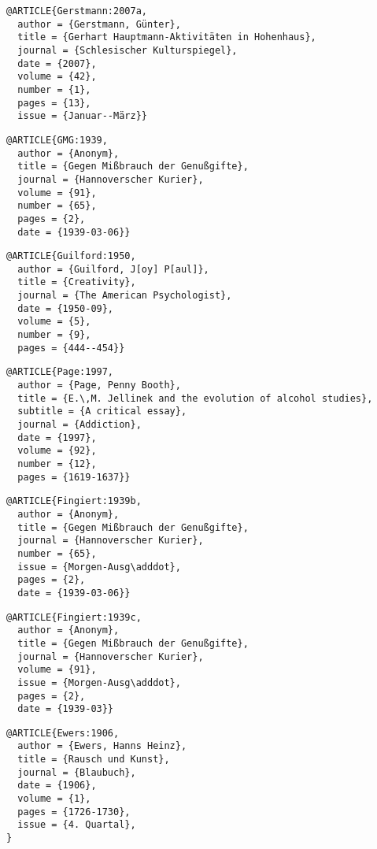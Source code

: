 \documentclass[english]{scrartcl}
\begin{document}
\begin{lstlisting}
@ARTICLE{Gerstmann:2007a,
  author = {Gerstmann, Günter},
  title = {Gerhart Hauptmann-Aktivitäten in Hohenhaus},
  journal = {Schlesischer Kulturspiegel},
  date = {2007},
  volume = {42},
  number = {1},
  pages = {13},
  issue = {Januar--März}}
\end{lstlisting}

\begin{lstlisting}
@ARTICLE{GMG:1939,
  author = {Anonym},
  title = {Gegen Mißbrauch der Genußgifte},
  journal = {Hannoverscher Kurier},
  volume = {91},
  number = {65},
  pages = {2},
  date = {1939-03-06}}
\end{lstlisting}

\begin{lstlisting}
@ARTICLE{Guilford:1950,
  author = {Guilford, J[oy] P[aul]},
  title = {Creativity},
  journal = {The American Psychologist},
  date = {1950-09},
  volume = {5},
  number = {9},
  pages = {444--454}}
\end{lstlisting}

\begin{lstlisting}
@ARTICLE{Page:1997,
  author = {Page, Penny Booth},
  title = {E.\,M. Jellinek and the evolution of alcohol studies},
  subtitle = {A critical essay},
  journal = {Addiction},
  date = {1997},
  volume = {92},
  number = {12},
  pages = {1619-1637}}
\end{lstlisting}

\begin{lstlisting}
@ARTICLE{Fingiert:1939b,
  author = {Anonym},
  title = {Gegen Mißbrauch der Genußgifte},
  journal = {Hannoverscher Kurier},
  number = {65},
  issue = {Morgen-Ausg\adddot},
  pages = {2},
  date = {1939-03-06}}
\end{lstlisting}

\begin{lstlisting}
@ARTICLE{Fingiert:1939c,
  author = {Anonym},
  title = {Gegen Mißbrauch der Genußgifte},
  journal = {Hannoverscher Kurier},
  volume = {91},
  issue = {Morgen-Ausg\adddot},
  pages = {2},
  date = {1939-03}}
\end{lstlisting}


\begin{lstlisting}
@ARTICLE{Ewers:1906,
  author = {Ewers, Hanns Heinz},
  title = {Rausch und Kunst},
  journal = {Blaubuch},
  date = {1906},
  volume = {1},
  pages = {1726-1730},
  issue = {4. Quartal},
}
\end{lstlisting}
\end{document}
